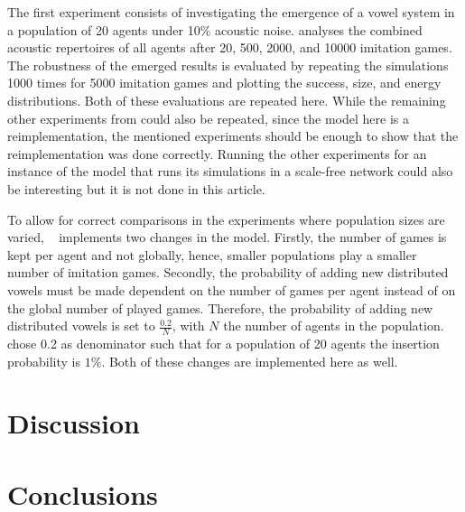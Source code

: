 \documentclass{article}
\begin{document}
The first experiment consists of investigating the emergence of a vowel system in a population of 20 agents under 10\%
acoustic noise.
 analyses the combined acoustic repertoires of all agents after 20,
500, 2000, and 10000 imitation games. The robustness of the emerged results is evaluated by repeating the simulations
1000 times for 5000 imitation games and plotting the success, size, and energy distributions. Both of these evaluations
are repeated here. While the remaining other experiments from  could
also be repeated, since the model here is a reimplementation, the mentioned experiments should be enough to show that
the reimplementation was done correctly. Running the other experiments for an instance of the model that runs its
simulations in a scale-free network could also be interesting but it is not done in this article.

To allow for correct comparisons in the experiments where population sizes are varied,
~ implements two changes in the model. Firstly, the number of games
is kept per agent and not globally, hence, smaller populations play a smaller number of imitation games. Secondly, the
probability of adding new distributed vowels must be made dependent on the number of games per agent instead of on the
global number of played games. Therefore, the probability of adding new distributed vowels is set to $\frac{0.2}{N}$,
with $N$ the number of agents in the population.  chose 0.2 as
denominator such that for a population of 20 agents the insertion probability is $1\%$. Both of these changes are
implemented here as well.

\section{Discussion\label{sec:discus}}

\section{Conclusions\label{sec:conclusion}}


\end{document}
